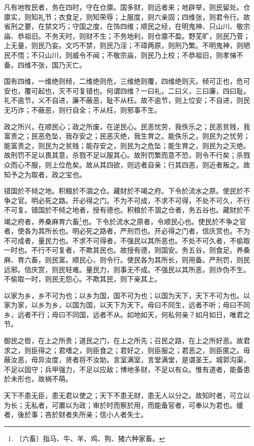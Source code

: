 \documentclass[12pt,UTF-8,openany,a4]{ctexbook}
\begin{document}
\begin{large}
    
    凡有地牧民者，务在四时，守在仓廪。国多财，则远者来；地辟举，则民留处。仓廪实，则知礼节；衣食足，则知荣辱；上服度，则六亲固；四维张，则君令行。故省刑之要，在禁文巧；守国之度，在饰四维；顺民之经，在明鬼神、只山川、敬宗庙、恭祖旧。不务天时，则财不生；不务地利，则仓廪不盈。野芜旷，则民乃菅；上无量，则民乃妄。文巧不禁，则民乃淫；不璋两原，则刑乃繁。不明鬼神，则陋民不悟；不只山川，则威令不闻；不敬宗庙，则民乃上校；不恭祖旧，则孝悌不备。四维不张，国乃灭亡。
    
    国有四维，一维绝则倾，二维绝则危，三维绝则覆，四维绝则灭。倾可正也，危可安也，覆可起也，灭不可复错也。何谓四维？一曰礼，二曰义，三曰廉，四曰耻。礼不逾节，义不自进，廉不蔽恶，耻不从枉。故不逾节，则上位安；不自进，则民无巧诈；不蔽恶，则行自全；不从枉，则邪事不生。
    
    政之所兴，在顺民心；政之所废，在逆民心。民恶忧劳，我佚乐之；民恶贫贱，我富贵之；民恶危坠，我存安之；民恶灭绝，我生育之。能佚乐之，则民为之忧劳；能富贵之，则民为之贫贱；能存安之，则民为之危坠；能生育之，则民为之灭绝。故刑罚不足以畏其意，杀戮不足以服其心。故刑罚繁而意不恐，则令不行矣；杀戮众而心不服，则上位危矣。故从其四欲，则远者自亲；行其四恶，则近者叛之。故知予之为取者，政之宝也。
    
    错国於不倾之地。积粮於不涸之仓。藏财於不竭之府。下令於流水之原。使民於不争之官。明必死之路。开必得之门。不为不可成，不求不可得，不处不可久，不行不可复。错国於不倾之地者，授有德也。积粮於不涸之仓者，务五谷也。藏财於不竭之府者，养桑麻育六畜\footnote{〔六畜〕\yiwen 指马、牛、羊、鸡、狗、猪六种家畜。}也。下令於流水之原者，令顺民心也。使民於不争之官者，使各为其所长也。明必死之路者，严刑罚也。开必得之门者，信庆赏也。不为不可成者，量民力也。不求不可得者，不强民以其所恶也。不处不可久者，不偷取一时也。不行不可复者，不欺其民也。故授有德，则国安。务五谷，则食足。养桑麻、育六畜，则民富。顺民心，则令行。使民各为其所长，则用备。严刑罚，则民远邪。信庆赏，则民轻难。量民力，则事无不成。不强民以其所恶，则诈伪不生。不偷取一时，则民无怨心。不欺其民，则下亲其上。
    
    以家为乡，乡不可为也；以乡为国，国不可为也；以国为天下，天下不可为也。以家为家，以乡为乡，以国为国，以天下为天下。毋曰不同生，远者不听；毋曰不同乡，远者不行；毋曰不同国，远者不从。如地如天，何私何亲？如月如日，唯君之节。
    
    御民之辔，在上之所贵；道民之门，在上之所先；召民之路，在上之所好恶。故君求之，则臣得之；君嗜之，则臣食之；君好之，则臣服之；君恶之，则臣匿之。毋蔽汝恶，毋异汝度，贤者将不汝助。言室满室，言堂满堂，是谓圣王。城郭沟渠，不足以固守；兵甲强力，不足以应敌；博地多财，不足以有众。惟有道者，能备患於未形也，故祸不萌。
    
    天下不患无臣，患无君以使之；天下不患无财，患无人以分之。故知时者，可立以为长；无私者，可置以为政；审於时而察於用，而能备官者，可奉以为君也。缓者，後於事；吝於财者失所亲；信小人者失士。

\end{large}
\end{document}
